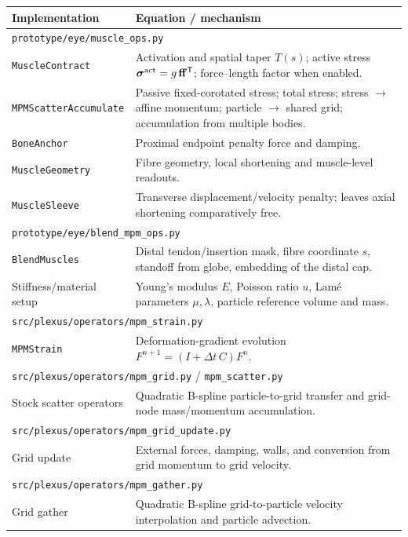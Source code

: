 \documentclass[11pt]{article}
\begin{document}
\begin{center}
\small
\begin{tabular}{p{}p{}}
\toprule
\textbf{Implementation} & \textbf{Equation / mechanism}\\
\midrule
\multicolumn{2}{l}{\texttt{prototype/eye/muscle\_ops.py}}\\[2pt]
\texttt{MuscleContract} & Activation and spatial taper $T(s)$; active stress $\boldsymbol{\sigma}^{\rm act}=g\,\mathbf f\mathbf f^{\mathsf T}$; force--length factor when enabled.\\
\texttt{MPMScatterAccumulate} & Passive fixed-corotated stress; total stress; stress $\to$ affine momentum; particle $\to$ shared grid; accumulation from multiple bodies.\\
\texttt{BoneAnchor} & Proximal endpoint penalty force and damping.\\
\texttt{MuscleGeometry} & Fibre geometry, local shortening and muscle-level readouts.\\
\texttt{MuscleSleeve} & Transverse displacement/velocity penalty; leaves axial shortening comparatively free.\\
\midrule
\multicolumn{2}{l}{\texttt{prototype/eye/blend\_mpm\_ops.py}}\\[2pt]
\texttt{BlendMuscles} & Distal tendon/insertion mask, fibre coordinate $s$, standoff from globe, embedding of the distal cap.\\
Stiffness/material setup & Young's modulus $E$, Poisson ratio $
u$, Lam\'e parameters $\mu,\lambda$, particle reference volume and mass.\\
\midrule
\multicolumn{2}{l}{\texttt{src/plexus/operators/mpm\_strain.py}}\\[2pt]
\texttt{MPMStrain} & Deformation-gradient evolution $F^{n+1}=(I+\Delta t\,C)F^n$.\\
\midrule
\multicolumn{2}{l}{\texttt{src/plexus/operators/mpm\_grid.py} / \texttt{mpm\_scatter.py}}\\[2pt]
Stock scatter operators & Quadratic B-spline particle-to-grid transfer and grid-node mass/momentum accumulation.\\
\midrule
\multicolumn{2}{l}{\texttt{src/plexus/operators/mpm\_grid\_update.py}}\\[2pt]
Grid update & External forces, damping, walls, and conversion from grid momentum to grid velocity.\\
\midrule
\multicolumn{2}{l}{\texttt{src/plexus/operators/mpm\_gather.py}}\\[2pt]
Grid gather & Quadratic B-spline grid-to-particle velocity interpolation and particle advection.\\
\bottomrule
\end{tabular}
\end{center}
\end{document}
